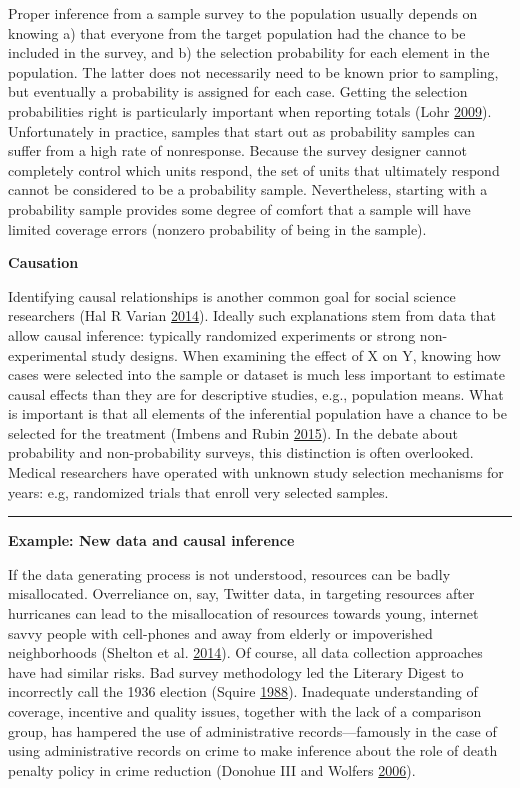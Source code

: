 \documentclass[]{krantz}
\begin{document}
Proper inference from a sample survey to the population usually depends
on knowing a) that everyone from the target population had the chance to
be included in the survey, and b) the selection probability for each
element in the population. The latter does not necessarily need to be
known prior to sampling, but eventually a probability is assigned for
each case. Getting the selection probabilities right is particularly
important when reporting totals (Lohr
\protect\hyperlink{ref-lohr2009sampling}{2009}). Unfortunately in
practice, samples that start out as probability samples can suffer from
a high rate of nonresponse. Because the survey designer cannot
completely control which units respond, the set of units that ultimately
respond cannot be considered to be a probability sample. Nevertheless,
starting with a probability sample provides some degree of comfort that
a sample will have limited coverage errors (nonzero probability of being
in the sample).

\textbf{Causation}

Identifying causal relationships is another common goal for social
science researchers (Hal R Varian
\protect\hyperlink{ref-varian2014big}{2014}). Ideally such explanations
stem from data that allow causal inference: typically randomized
experiments or strong non-experimental study designs. When examining the
effect of X on Y, knowing how cases were selected into the sample or
dataset is much less important to estimate causal effects than they are
for descriptive studies, e.g., population means. What is important is
that all elements of the inferential population have a chance to be
selected for the treatment (Imbens and Rubin
\protect\hyperlink{ref-imbens2015causal}{2015}). In the debate about
probability and non-probability surveys, this distinction is often
overlooked. Medical researchers have operated with unknown study
selection mechanisms for years: e.g, randomized trials that enroll very
selected samples.

\begin{center}\rule{0.5\linewidth}{\linethickness}\end{center}

\textbf{Example: New data and causal inference}

If the data generating process is not understood, resources can be badly
misallocated. Overreliance on, say, Twitter data, in targeting resources
after hurricanes can lead to the misallocation of resources towards
young, internet savvy people with cell-phones and away from elderly or
impoverished neighborhoods (Shelton et al.
\protect\hyperlink{ref-shelton2014mapping}{2014}). Of course, all data
collection approaches have had similar risks. Bad survey methodology led
the Literary Digest to incorrectly call the 1936 election (Squire
\protect\hyperlink{ref-squire19881936}{1988}). Inadequate understanding
of coverage, incentive and quality issues, together with the lack of a
comparison group, has hampered the use of administrative
records---famously in the case of using administrative records on crime
to make inference about the role of death penalty policy in crime
reduction (Donohue III and Wolfers
\protect\hyperlink{ref-donohue2006uses}{2006}).
\end{document}
